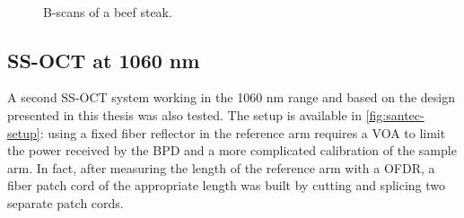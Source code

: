 \begin{figure}[htb]
	\myfloatalign
	 \quad
	 \\
	\caption{B-scans of a beef steak.}\label{fig:steak}
\end{figure}


%
%

\FloatBarrier
\subsection{SS-OCT at 1060 nm}
A second SS-OCT system working in the 1060 nm range and based on the design presented in this thesis was also tested. The setup is available in \autoref{fig:santec-setup}: using a fixed fiber reflector in the reference arm requires a \ac{VOA} to limit the power received by the BPD and a more complicated calibration of the sample arm. In fact, after measuring the length of the reference arm with a \ac{OFDR}, a fiber patch cord of the appropriate length was built by cutting and splicing two separate patch cords. 

